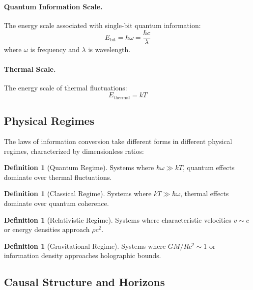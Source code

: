 \documentclass[11pt,a4paper]{article}
\theoremstyle{plain}
\theoremstyle{definition}
\newtheorem{definition}[theorem]{Definition}
\theoremstyle{remark}
\begin{document}
\paragraph{Quantum Information Scale.} The energy scale associated with single-bit quantum information:
\begin{equation}
E_{\text{bit}} = \hbar\omega = \frac{\hbar c}{\lambda}
\end{equation}
where $\omega$ is frequency and $\lambda$ is wavelength.

\paragraph{Thermal Scale.} The energy scale of thermal fluctuations:
\begin{equation}
E_{\text{thermal}} = kT
\end{equation}

\subsection{Physical Regimes}

The laws of information conversion take different forms in different physical regimes, characterized by dimensionless ratios:

\begin{definition}[Quantum Regime]
Systems where $\hbar\omega \gg kT$, quantum effects dominate over thermal fluctuations.
\end{definition}

\begin{definition}[Classical Regime]
Systems where $kT \gg \hbar\omega$, thermal effects dominate over quantum coherence.
\end{definition}

\begin{definition}[Relativistic Regime]
Systems where characteristic velocities $v \sim c$ or energy densities approach $\rho c^2$.
\end{definition}

\begin{definition}[Gravitational Regime]
Systems where $GM/Rc^2 \sim 1$ or information density approaches holographic bounds.
\end{definition}

\subsection{Causal Structure and Horizons}
\end{document}
